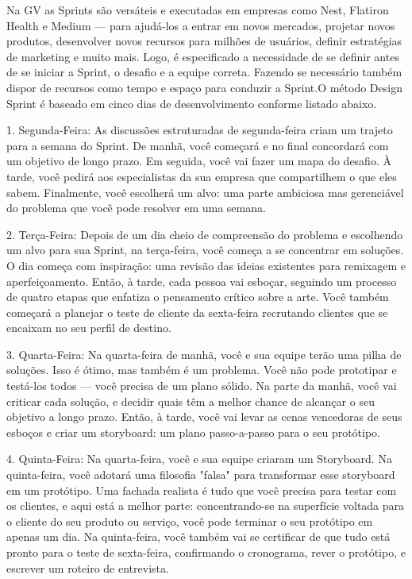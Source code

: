 Na GV as Sprints são versáteis e executadas em empresas como Nest, Flatiron Health e Medium — para ajudá-los a entrar em novos mercados, projetar novos produtos, desenvolver novos recursos para milhões de usuários, definir estratégias de marketing e muito mais. Logo, é especificado a necessidade de se definir antes de se iniciar a Sprint, o desafio e a equipe correta. Fazendo se necessário também dispor de recursos como tempo e espaço para conduzir a Sprint.O método Design Sprint é baseado em cinco dias de desenvolvimento conforme listado abaixo.

1. Segunda-Feira: As discussões estruturadas de segunda-feira criam um trajeto para a semana do Sprint. De manhã, você começará e no final concordará com um objetivo de longo prazo. Em seguida, você vai fazer um mapa do desafio. À tarde, você pedirá aos especialistas da sua empresa que compartilhem o que eles sabem. Finalmente, você escolherá um alvo: uma parte ambiciosa mas gerenciável do problema que você pode resolver em uma semana.

2. Terça-Feira: Depois de um dia cheio de compreensão do problema e escolhendo um alvo para sua Sprint, na terça-feira, você começa a se concentrar em soluções. O dia começa com inspiração: uma revisão das ideias existentes para remixagem e aperfeiçoamento. Então, à tarde, cada pessoa vai esboçar, seguindo um processo de quatro etapas que enfatiza o pensamento crítico sobre a arte. Você também começará a planejar o teste de cliente da sexta-feira recrutando clientes que se encaixam no seu perfil de destino.

3. Quarta-Feira: Na quarta-feira de manhã, você e sua equipe terão uma pilha de soluções. Isso é ótimo, mas também é um problema. Você não pode prototipar e testá-los todos — você precisa de um plano sólido. Na parte da manhã, você vai criticar cada solução, e decidir quais têm a melhor chance de alcançar o seu objetivo a longo prazo. Então, à tarde, você vai levar as cenas vencedoras de seus esboços e criar um storyboard: um plano passo-a-passo para o seu protótipo.

4. Quinta-Feira: Na quarta-feira, você e sua equipe criaram um Storyboard. Na quinta-feira, você adotará uma filosofia "falsa" para transformar esse storyboard em um protótipo. Uma fachada realista é tudo que você precisa para testar com os clientes, e aqui está a melhor parte: concentrando-se na superfície voltada para o cliente do seu produto ou serviço, você pode terminar o seu protótipo em apenas um dia. Na quinta-feira, você também vai se certificar de que tudo está pronto para o teste de sexta-feira, confirmando o cronograma, rever o protótipo, e escrever um roteiro de entrevista.


